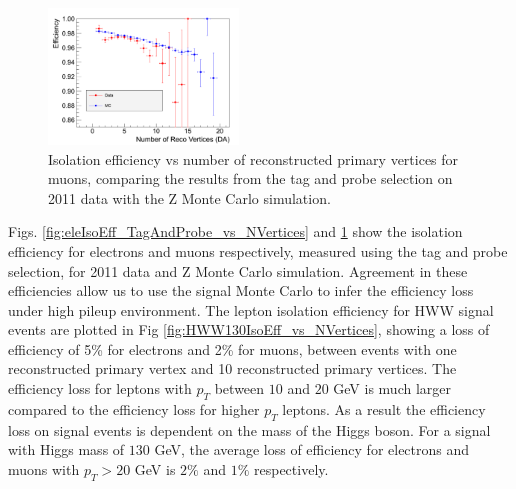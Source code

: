 \begin{figure}[!htbp]
\begin{center}
\includegraphics[width=0.45\textwidth]{figures/MuonIsolationEffVsNVertices_TagAndProbe.pdf}
\caption{Isolation efficiency vs number of reconstructed primary vertices for muons, comparing the 
results from the tag and probe selection on 2011 data with the Z Monte Carlo simulation.}
\label{fig:muIsoEff_TagAndProbe_vs_NVertices}
\end{center}
\end{figure}

Figs. \ref{fig:eleIsoEff_TagAndProbe_vs_NVertices} and \ref{fig:muIsoEff_TagAndProbe_vs_NVertices} 
show the isolation efficiency for electrons and muons respectively, measured using the
tag and probe selection, for 2011 data and Z Monte Carlo simulation. Agreement in these
efficiencies allow us to use the signal Monte Carlo to infer the efficiency loss under 
high pileup environment. The lepton isolation efficiency for HWW signal events are plotted
in Fig \ref{fig:HWW130IsoEff_vs_NVertices}, showing a loss of efficiency of 5\% for 
electrons and 2\% for muons, between events with one reconstructed primary vertex
and 10 reconstructed primary vertices. The efficiency loss for leptons with $p_{T}$ 
between $10$ and $20$ GeV is much larger compared to the efficiency loss for higher
$p_{T}$ leptons. As a result the efficiency loss on signal events is dependent 
on the mass of the Higgs boson. For a signal with Higgs mass of $130$ GeV, 
the average loss of efficiency for electrons and muons with $p_{T}>20$ GeV is
$2\%$ and $1\%$ respectively. 


